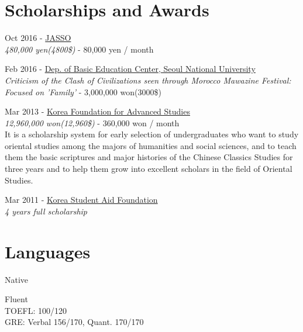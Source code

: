 \documentclass[10pt]{article} %
\begin{document}
\section{Scholarships and Awards}

{
Oct 2016 - \href{http://www.jasso.go.jp/ryugaku/tantosha/study_a/short_term_h/index.html}{JASSO}\\
\textit{480,000 yen(4800\$)} - 80,000 yen / month\\
}

{
Feb 2016 - \href{http://liberaleduenglish.snu.ac.kr/}{Dep. of Basic Education Center, Seoul National University}\\
\textit{Criticism of the Clash of Civilizations seen through Morocco Mawazine Festival: Focused on 'Family'} - 3,000,000 won(3000\$)\\
}

{
Mar 2013 - \href{http://www.kfas.or.kr/?pCulture=en}{Korea Foundation for Advanced Studies}\\
\textit{12,960,000 won(12,960\$)} - 360,000 won / month\\
It is a scholarship system for early selection of undergraduates who want to study oriental studies among the majors of humanities and social sciences, and to teach them the basic scriptures and major histories of the Chinese Classics Studies for three years and to help them grow into excellent scholars in the field of Oriental Studies.
}

{
Mar 2011 - \href{http://eng.kosaf.go.kr/jsp/main.jsp}{Korea Student Aid Foundation}\\
\textit{4 years full scholarship}\\
}


\section{Languages}

{
Native
}

{
Fluent\\
TOEFL: 100/120\\
GRE: Verbal 156/170, Quant. 170/170
}
\end{document}

